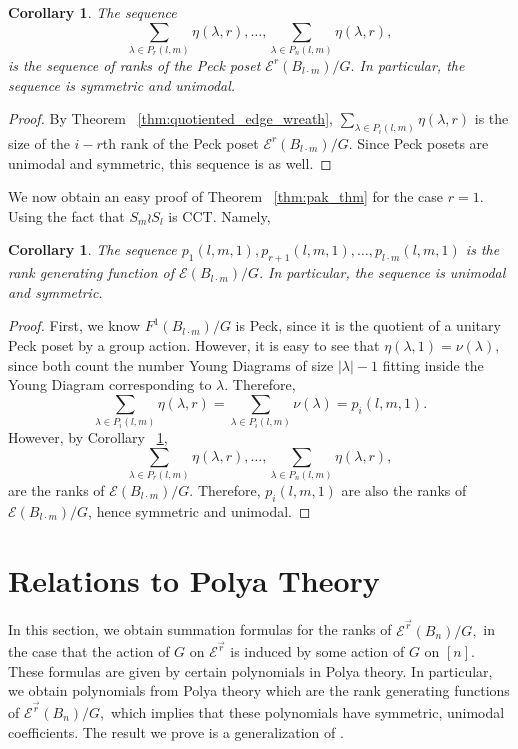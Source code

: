 \documentclass[10 pt]{amsart}
\theoremstyle{plain}
\newtheorem{cor}[thm]{Corollary}
\theoremstyle{definition}
\theoremstyle{remark}
\numberwithin{equation}{section}
\renewcommand{\vec}[1]{\overrightarrow{#1}}
\begin{document}
\begin{cor}
\label{cor:unimodal_wreath_r_sequence}
The sequence 
$$\sum_{\lambda \in P_r(l,m)} \eta(\lambda,r),\ldots,\sum_{\lambda \in P_n(l,m)} \eta(\lambda,r),$$
is the sequence of ranks of the Peck poset $\mathcal E^r(B_{l\cdot m})/G.$ In particular, the sequence is symmetric and unimodal.
\end{cor}
\begin{proof}
By Theorem ~\ref{thm:quotiented_edge_wreath}, $\sum_{\lambda \in P_i(l,m)} \eta(\lambda,r)$ is the size of the $i-r$th rank of the Peck poset $\mathcal E^r(B_{l\cdot m})/G.$ Since Peck posets are unimodal and symmetric, this sequence is as well.
\end{proof}

We now obtain an easy proof of Theorem ~\ref{thm:pak_thm} for the case $r = 1.$ Using the fact that $S_m\wr S_l$ is CCT. Namely,

\begin{cor}
\label{cor:rank_gen_fn_wreath_1}
The sequence $p_1(l,m,1), p_{r+1}(l,m,1),\ldots, p_{l\cdot m}(l,m,1)$ is the rank generating function of $\mathcal E(B_{l\cdot m})/G.$ In particular, the sequence is unimodal and symmetric.
\end{cor}
\begin{proof}
First, we know $F^1(B_{l\cdot m})/G$ is Peck, since it is the quotient of a unitary Peck poset by a group action. However, it is easy to see that $\eta(\lambda,1) = \nu(\lambda),$ since both count the number Young Diagrams of size $|\lambda|-1$ fitting inside the Young Diagram corresponding to $\lambda.$ Therefore, 
$$\sum_{\lambda \in P_i(l,m)} \eta(\lambda,r) = \sum_{\lambda \in P_i(l,m)}\nu(\lambda) = p_i(l,m,1).$$
However, by Corollary ~\ref{cor:unimodal_wreath_r_sequence}, 
$$\sum_{\lambda \in P_r(l,m)} \eta(\lambda,r),\ldots,\sum_{\lambda \in P_n(l,m)} \eta(\lambda,r),$$
are the ranks of $\mathcal E(B_{l\cdot m})/G.$ Therefore, $p_i(l,m,1)$ are also the ranks of $\mathcal E(B_{l\cdot m})/G$, hence symmetric and unimodal.
\end{proof}







\section{Relations to Polya Theory}
\label{sec:polya}
In this section, we obtain summation formulas for the ranks of $\mathcal E^{\vec r}(B_n)/G,$ in the case that the action of $G$ on $\mathcal E^{\vec r}$ is induced by some action of $G$ on $[n].$ These formulas are given by certain polynomials in Polya theory. In particular, we obtain polynomials from Polya theory which are the rank generating functions of $\mathcal E^{\vec r}(B_n)/G,$ which implies that these polynomials have symmetric, unimodal coefficients. The result we prove is a generalization of \cite[Corollary 7.16]{algebraic_stanley}. 
\end{document}
